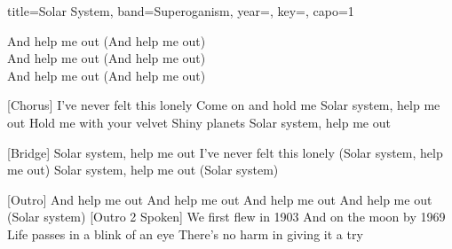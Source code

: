 \documentclass{skrul-leadsheet}
\begin{document}
\begin{song}[transpose-capo=true]{title={Solar System}, band={Superoganism}, year={}, key={}, capo={1}}
\begin{prechorus}
And help me out (And help me out) \\
And help me out (And help me out) \\
And help me out (And help me out)
\end{prechorus}

[Chorus]
I've never felt this lonely
Come on and hold me
Solar system, help me out
Hold me with your velvet
Shiny planets
Solar system, help me out

[Bridge]
Solar system, help me out
I've never felt this lonely
(Solar system, help me out)
Solar system, help me out
(Solar system)

[Outro]
And help me out
And help me out
And help me out
And help me out
(Solar system)
[Outro 2 Spoken]
We first flew in 1903
And on the moon by 1969
Life passes in a blink of an eye
There's no harm in giving it a try

\end{song}
\end{document}
